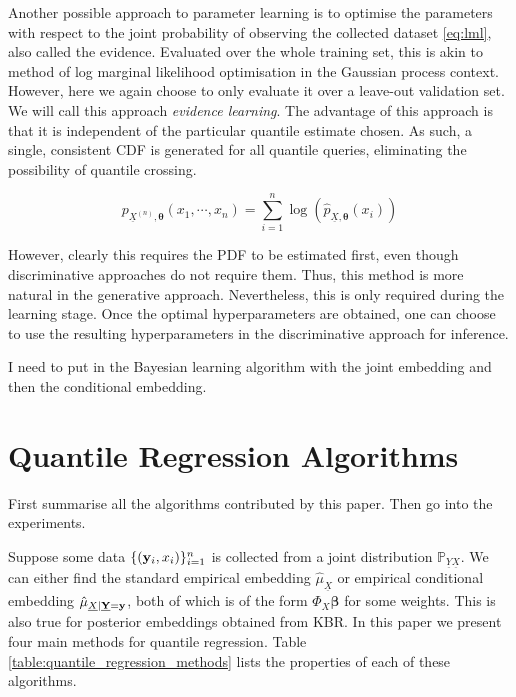 \documentclass[twoside]{article} \usepackage{aistats2017}
\theoremstyle{definition}
\theoremstyle{remark}
\newcommand{\rv}[1]{\underline{#1}}
\newcommand{\ds}[1]{{#1}}
\newcommand{\warn}[1]{{\color{RedOrange} #1}}
\begin{document}
	Another possible approach to parameter learning is to optimise the parameters with respect to the joint probability of observing the collected dataset \eqref{eq:lml}, also called the evidence. Evaluated over the whole training set, this is akin to method of log marginal likelihood optimisation in the Gaussian process context. However, here we again choose to only evaluate it over a leave-out validation set. We will call this approach \textit{evidence learning}. The advantage of this approach is that it is independent of the particular quantile estimate chosen. As such, a single, consistent CDF is generated for all quantile queries, eliminating the possibility of quantile crossing. 
	
	\begin{equation}
		p_{\rv{X}^{(n)}, \bm{\theta}}(x_{1}, \cdots, x_{n}) = \sum_{i = 1}^{n} \log(\hat{p}_{\rv{X}, \bm{\theta}}(x_{i}))
	\label{eq:lml}
	\end{equation}
	
	However, clearly this requires the PDF to be estimated first, even though discriminative approaches do not require them. Thus, this method is more natural in the generative approach. Nevertheless, this is only required during the learning stage. Once the optimal hyperparameters are obtained, one can choose to use the resulting hyperparameters in the discriminative approach for inference.
	
	\warn{I need to put in the Bayesian learning algorithm with the joint embedding and then the conditional embedding.}
	
\section{Quantile Regression Algorithms}
\label{sec:quantile_regression_algorithms}

	\warn{First summarise all the algorithms contributed by this paper. Then go into the experiments.}
	
	Suppose some data $\{(\mathbf{y}_{i}, x_{i})\}_{i = 1}^{n}$ is collected from a joint distribution $\mathbb{P}_{\rv{Y} \rv{X}}$. We can either find the standard empirical embedding $\hat{\mu}_{\rv{X}}$ or empirical conditional embedding $\hat{\mu}_{\rv{X} | \bvec{\rv{Y}} = \bvec{y}}$, both of which is of the form $\Phi_{\ds{X}} \bm{\beta}$ for some weights. This is also true for posterior embeddings obtained from KBR. In this paper we present four main methods for quantile regression. 	Table \ref{table:quantile_regression_methods} lists the properties of each of these algorithms.
\end{document}
